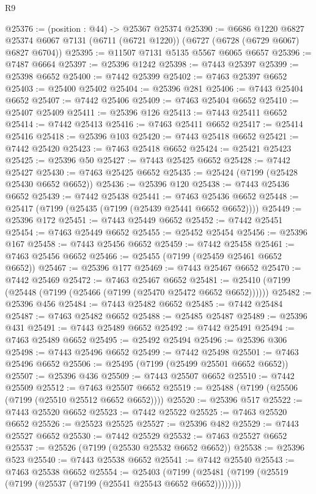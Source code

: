 \begin{lexlean}{R9}
\begin{coremodule}
@25376 := (position : @44) -> @25367 @25374
@25390 := @6686
    @1220
    @6827
    @25374
    @6067
    @7131
    (@6711 (@6721 @1220))
    (@6727 (@6728 (@6729 @6067) @6827 @6704))
@25395 := @11507 @7131 @5135 @5567 @6065 @6657
@25396 := @7487 @6664
@25397 := @25396 @1242
@25398 := @7443 @25397
@25399 := @25398 @6652
@25400 := @7442 @25399
@25402 := @7463 @25397 @6652
@25403 := @25400 @25402
@25404 := @25396 @281
@25406 := @7443 @25404 @6652
@25407 := @7442 @25406
@25409 := @7463 @25404 @6652
@25410 := @25407 @25409
@25411 := @25396 @126
@25413 := @7443 @25411 @6652
@25414 := @7442 @25413
@25416 := @7463 @25411 @6652
@25417 := @25414 @25416
@25418 := @25396 @103
@25420 := @7443 @25418 @6652
@25421 := @7442 @25420
@25423 := @7463 @25418 @6652
@25424 := @25421 @25423
@25425 := @25396 @50
@25427 := @7443 @25425 @6652
@25428 := @7442 @25427
@25430 := @7463 @25425 @6652
@25435 := @25424 (@7199 (@25428 @25430 @6652 @6652))
@25436 := @25396 @120
@25438 := @7443 @25436 @6652
@25439 := @7442 @25438
@25441 := @7463 @25436 @6652
@25448 := @25417 (@7199 (@25435 (@7199 (@25439 @25441 @6652 @6652))))
@25449 := @25396 @172
@25451 := @7443 @25449 @6652
@25452 := @7442 @25451
@25454 := @7463 @25449 @6652
@25455 := @25452 @25454
@25456 := @25396 @167
@25458 := @7443 @25456 @6652
@25459 := @7442 @25458
@25461 := @7463 @25456 @6652
@25466 := @25455 (@7199 (@25459 @25461 @6652 @6652))
@25467 := @25396 @177
@25469 := @7443 @25467 @6652
@25470 := @7442 @25469
@25472 := @7463 @25467 @6652
@25481 := @25410 (@7199 (@25448 (@7199 (@25466 (@7199 (@25470 @25472 @6652 @6652))))))
@25482 := @25396 @456
@25484 := @7443 @25482 @6652
@25485 := @7442 @25484
@25487 := @7463 @25482 @6652
@25488 := @25485 @25487
@25489 := @25396 @431
@25491 := @7443 @25489 @6652
@25492 := @7442 @25491
@25494 := @7463 @25489 @6652
@25495 := @25492 @25494
@25496 := @25396 @306
@25498 := @7443 @25496 @6652
@25499 := @7442 @25498
@25501 := @7463 @25496 @6652
@25506 := @25495 (@7199 (@25499 @25501 @6652 @6652))
@25507 := @25396 @436
@25509 := @7443 @25507 @6652
@25510 := @7442 @25509
@25512 := @7463 @25507 @6652
@25519 := @25488 (@7199 (@25506 (@7199 (@25510 @25512 @6652 @6652))))
@25520 := @25396 @517
@25522 := @7443 @25520 @6652
@25523 := @7442 @25522
@25525 := @7463 @25520 @6652
@25526 := @25523 @25525
@25527 := @25396 @482
@25529 := @7443 @25527 @6652
@25530 := @7442 @25529
@25532 := @7463 @25527 @6652
@25537 := @25526 (@7199 (@25530 @25532 @6652 @6652))
@25538 := @25396 @523
@25540 := @7443 @25538 @6652
@25541 := @7442 @25540
@25543 := @7463 @25538 @6652
@25554 := @25403
    (@7199 (@25481 (@7199 (@25519 (@7199 (@25537 (@7199 (@25541 @25543 @6652 @6652))))))))

\end{coremodule}
\end{lexlean}

